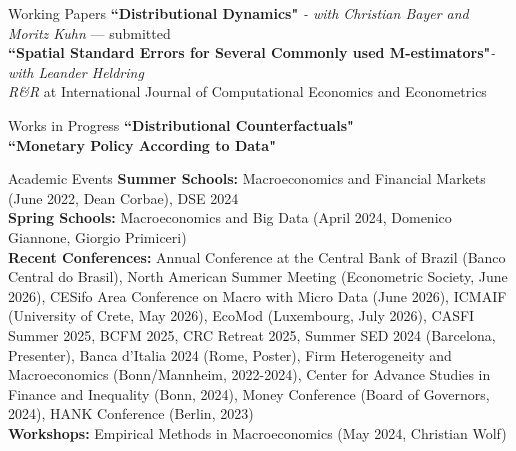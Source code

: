 \documentclass{resume}[10pt] %
\begin{document}
\footnotesize
\begin{rSection}{Working Papers}
\textbf{``Distributional Dynamics"} \textit{- with Christian Bayer and Moritz Kuhn} --- submitted \\
\textbf{``Spatial Standard Errors for Several Commonly used M-estimators"}\textit{- with Leander Heldring}\\ \textit{R\&R} at International Journal of Computational Economics and Econometrics\\
\end{rSection}

\begin{rSection}{Works in Progress}
\textbf{``Distributional Counterfactuals"} \\
\textbf{``Monetary Policy According to Data"}
\end{rSection}

\footnotesize
\begin{rSection}{Academic Events}
\textbf{Summer Schools:} Macroeconomics and Financial Markets (June 2022, Dean Corbae), DSE 2024  \\
\textbf{Spring Schools:} Macroeconomics and Big Data (April 2024, Domenico Giannone, Giorgio Primiceri) \\
\textbf{Recent Conferences:} Annual Conference at the Central Bank of Brazil (Banco Central do Brasil), North American Summer Meeting (Econometric Society, June 2026), CESifo Area Conference on Macro with Micro Data (June 2026), ICMAIF (University of Crete, May 2026), EcoMod (Luxembourg, July 2026), CASFI Summer 2025, BCFM 2025, CRC Retreat 2025, Summer SED 2024 (Barcelona, Presenter), Banca d'Italia 2024 (Rome, Poster), Firm Heterogeneity and Macroeconomics (Bonn/Mannheim, 2022-2024), Center for Advance Studies in Finance and Inequality (Bonn, 2024), Money Conference (Board of Governors, 2024), HANK Conference (Berlin, 2023)  \\
\textbf{Workshops:} Empirical Methods in Macroeconomics (May 2024, Christian Wolf)
\end{rSection}
\newpage
\end{document}

